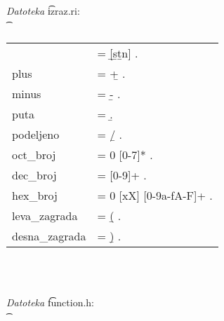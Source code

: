       {\sl Datoteka} \t{izraz.ri}:\\
      \t
      {
        \begin{tabular}{ll}
                        &= [{\b}s{\b}t{\b}n] .\\
          plus          &= \b+ .\\
          minus         &= \b- .\\
          puta          &= \b* .\\
          podeljeno     &= \b/ .\\
          oct\_broj     &= 0 [0-7]* .\\
          dec\_broj     &= [0-9]+ .\\
          hex\_broj     &= 0 [xX] [0-9a-fA-F]+ .\\
          leva\_zagrada &= \b( .\\
          desna\_zagrada&= \b) .\\
        \end{tabular}\\
      }\\
      {\sl Datoteka} \t{function.h}:\\
      \t
